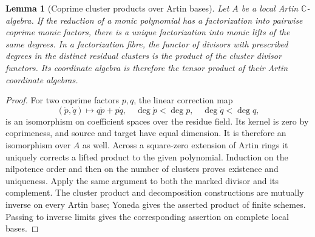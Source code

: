 \documentclass[11pt,reqno]{amsart}
\numberwithin{equation}{section}
\newtheorem{lemma}[theorem]{Lemma}
\theoremstyle{definition}\newtheorem{definition}[theorem]{Definition}
\theoremstyle{remark}\newtheorem{remark}[theorem]{Remark}
\newcommand{\C}{\mathbb C}\newcommand{\Q}{\mathbb Q}
\begin{document}
\begin{lemma}[Coprime cluster products over Artin bases]
\label{lem:hensel-products-v154}
Let $A$ be a local Artin $\C$-algebra. If the reduction of a monic
polynomial has a factorization into pairwise coprime monic factors,
there is a unique factorization into monic lifts of the same degrees.
In a factorization fibre, the functor of divisors with prescribed
degrees in the distinct residual clusters is the product of the
cluster divisor functors. Its coordinate algebra is therefore the
tensor product of their Artin coordinate algebras.
\end{lemma}
\begin{proof}
For two coprime factors $p,q$, the linear correction map
\[
 (\dot p,\dot q)\longmapsto q\dot p+p\dot q,
 \quad\deg\dot p<\deg p,\quad\deg\dot q<\deg q,
\]
is an isomorphism on coefficient spaces over the residue field.
Its kernel is zero by coprimeness, and source and target have equal
dimension. It is therefore an isomorphism over $A$ as well. Across
a square-zero extension of Artin rings it uniquely corrects a
lifted product to the given polynomial. Induction on the nilpotence
order and then on the number of clusters proves existence and
uniqueness. Apply the same argument to both the marked divisor and
its complement. The cluster product and decomposition constructions
are mutually inverse on every Artin base; Yoneda gives the asserted
product of finite schemes. Passing to inverse limits gives the
corresponding assertion on complete local bases.
\end{proof}
\end{document}
